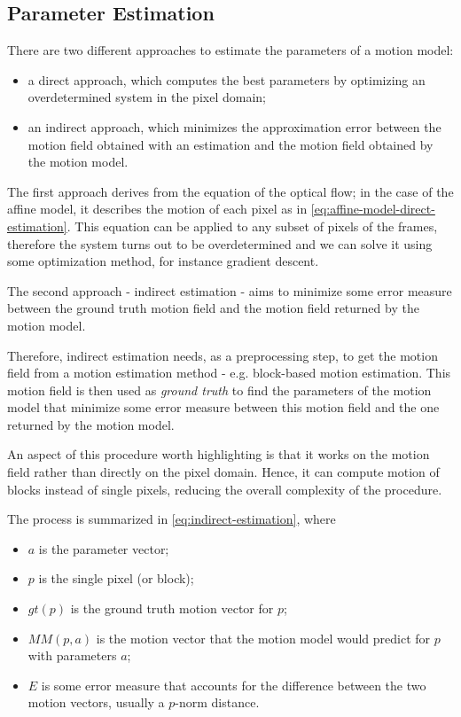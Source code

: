 

\subsection{Parameter Estimation}
There are two different approaches to estimate the parameters of a motion model:
\begin{itemize}
    \item a direct approach, which computes the best parameters by optimizing an overdetermined system in the pixel domain;
    \item an indirect approach, which minimizes the approximation error between the motion field obtained with an estimation and the motion field obtained by the motion model.
\end{itemize}

The first approach derives from the equation of the optical flow; in the case of the affine model, it describes the motion of each pixel as in \cref{eq:affine-model-direct-estimation}.
This equation can be applied to any subset of pixels of the frames, therefore the system turns out to be overdetermined and we can solve it using some optimization method, for instance gradient descent.

The second approach - indirect estimation - aims to minimize some error measure between the ground truth motion field and the motion field returned by the motion model.

Therefore, indirect estimation needs, as a preprocessing step, to get the motion field from a motion estimation method - e.g. block-based motion estimation. This motion field is then used as \textit{ground truth} to find the parameters of the motion model that minimize some error measure between this motion field and the one returned by the motion model.

An aspect of this procedure worth highlighting is that it works on the motion field rather than directly on the pixel domain. Hence, it can compute motion of blocks instead of single pixels, reducing the overall complexity of the procedure.

The process is summarized in \cref{eq:indirect-estimation}, where
\begin{itemize}
    \item $a$ is the parameter vector;
    \item $p$ is the single pixel (or block);
    \item $gt(p)$ is the ground truth motion vector for $p$;
    \item $MM(p,a)$ is the motion vector that the motion model would predict for $p$ with parameters $a$;
    \item $E$ is some error measure that accounts for the difference between the two motion vectors, usually a \(p\)-norm distance.
\end{itemize}

